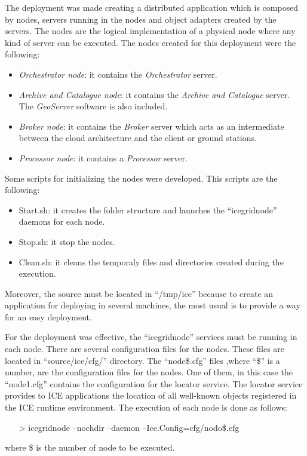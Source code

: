 The deployment was made creating a distributed application which is composed by
nodes, servers running in the nodes and object adapters created by the servers. 
The nodes are the logical implementation of a physical node where any kind of
server can be executed. The nodes created for this deployment were the
following:

\begin{itemize}
\item \emph{Orchestrator node}: it contains the \emph{Orchestrator} server.
\item \emph{Archive and Catalogue node}: it contains the \emph{Archive and Catalogue}
  server. The \emph{GeoServer} software is also included.
\item \emph{Broker node}: it contains the \emph{Broker} server which acts as an
  intermediate between the cloud architecture and the client or ground stations.
\item \emph{Processor node}: it contains a \emph{Processor} server. 
\end{itemize}


Some scripts for initializing the nodes were developed. This scripts are the
following: 
\begin{itemize}
\item Start.sh: it creates the folder structure and launches the
  ``icegridnode'' daemons for each node.
\item Stop.sh: it stop the nodes.
\item Clean.sh: it cleans the temporaly files and directories created during the execution.
\end{itemize}

Moreover, the source must be located in ``/tmp/ice'' because to create an application for
deploying in several machines, the most usual is to provide a way for an easy
deployment. 

For the deployment was effective, the ``icegridnode'' services must be running
in each node. 
There are several configuration files for the nodes. These files are located in
``source/ice/cfg/'' directory. The ``node\$.cfg'' files ,where ``\$'' is a number,
are the configuration files for the nodes. One of them, in this case the
``node1.cfg'' contains the configuration for the locator service. 
The locator service provides to ICE applications the location of all well-known
objects registered in the ICE runtime environment. 
The execution of each node is done as follows:
\begin{itemize}
\item[>]icegridnode --nochdir --daemon --Ice.Config=cfg/nodo\$.cfg
\end{itemize}
where \$ is the number of node to be executed.
 
